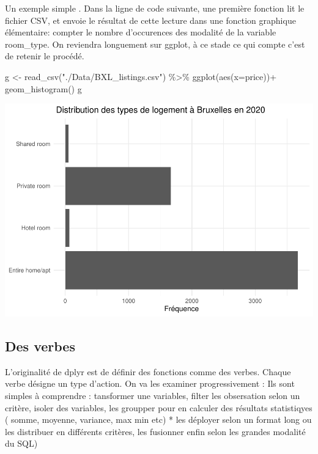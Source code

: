 \documentclass[
]{book}
\newenvironment{Shaded}{\begin{snugshade}}{\end{snugshade}}
\newcommand{\AttributeTok}[1]{\textcolor[rgb]{0.77,0.63,0.00}{#1}}
\newcommand{\FunctionTok}[1]{\textcolor[rgb]{0.00,0.00,0.00}{#1}}
\newcommand{\NormalTok}[1]{#1}
\newcommand{\OtherTok}[1]{\textcolor[rgb]{0.56,0.35,0.01}{#1}}
\newcommand{\SpecialCharTok}[1]{\textcolor[rgb]{0.00,0.00,0.00}{#1}}
\newcommand{\StringTok}[1]{\textcolor[rgb]{0.31,0.60,0.02}{#1}}
\begin{document}
Un exemple simple . Dans la ligne de code suivante, une première fonction lit le fichier CSV, et envoie le résultat de cette lecture dans une fonction graphique élémentaire: compter le nombre d'occurences des modalité de la variable room\_type. On reviendra longuement sur ggplot, à ce stade ce qui compte c'est de retenir le procédé.

\begin{Shaded}
\begin{Highlighting}[]
\NormalTok{g }\OtherTok{\textless{}{-}} \FunctionTok{read\_csv}\NormalTok{(}\StringTok{"./Data/BXL\_listings.csv"}\NormalTok{) }\SpecialCharTok{\%\textgreater{}\%} 
  \FunctionTok{ggplot}\NormalTok{(}\FunctionTok{aes}\NormalTok{(}\AttributeTok{x=}\NormalTok{price))}\SpecialCharTok{+}
  \FunctionTok{geom\_histogram}\NormalTok{()}
\NormalTok{g}
\end{Highlighting}
\end{Shaded}

\includegraphics{bookdown-demo_files/figure-latex/0203-1.pdf}

\hypertarget{des-verbes}{%
\subsection{Des verbes}\label{des-verbes}}

L'originalité de dplyr est de définir des fonctions comme des verbes. Chaque verbe désigne un type d'action. On va les examiner progressivement :
Ils sont simples à comprendre : tansformer une variables, filter les obsersation selon un critère, isoler des variables, les groupper pour en calculer des résultats statistiqyes ( somme, moyenne, variance, max min etc) * les déployer selon un format long ou les distribuer en différents critères, les fusionner enfin selon les grandes modalité du SQL)
\end{document}
